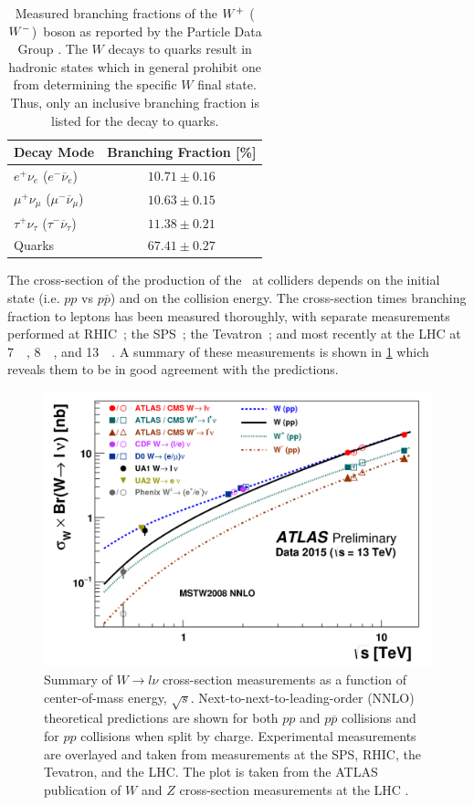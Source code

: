 \begin{table}[ht]
\centering
\begin{tabular}{l|c}
Decay Mode &  Branching Fraction [\%]\\
\hline
$e^+\nu_e$ ($e^-\overline{\nu}_e$) & $10.71 \pm 0.16$ \\
$\mu^+\nu_{\mu}$ ($\mu^-\overline{\nu}_{\mu}$) & $10.63 \pm 0.15$\\
$\tau^+\nu_{\tau}$ ($\tau^-\overline{\nu}_{\tau}$) & $11.38 \pm 0.21$\\
Quarks & $67.41 \pm 0.27$\\
\end{tabular}
\caption{Measured branching fractions of the $W^+$ ($W^-$)~boson 
as reported by the Particle Data Group \cite{PDG:2014}.  The $W$ decays
to quarks result in hadronic states which in general prohibit
one from determining the specific $W$ final state. Thus, only 
an inclusive branching fraction is listed for the decay to quarks.}
\label{tab:theory_wdecay}
\end{table}


The cross-section of the production of the \dubya~at colliders
depends on the initial state (i.e. $pp$ vs $p\overline{p}$) and on the
collision energy. 
The cross-section times branching fraction to leptons 
has been measured thoroughly, with separate measurements performed
at RHIC~\cite{PhysRevLett.106.062001};
the SPS~\cite{Albajar1987271,Alitti1992365};
the Tevatron~\cite{0954-3899-34-12-001,D0-4403-CONF};
and most recently at the LHC 
at 7~\TeV~\cite{PhysRevD.85.072004,Chatrchyan:1370079}, 
8~\TeV~\cite{PhysRevLett.112.191802}, 
and 13~\TeV~\cite{ATLAS-CONF-2015-039,CMS-PAS-SMP-15-004}. 
A summary of these measurements is shown in 
\fig\ref{fig:theory_wxsec} which reveals them to be in good agreement with 
the predictions.

\begin{figure}[ht]
\centering
\includegraphics[width=.8\textwidth]{figures/theory/wxsec.png}
\caption{Summary of $W\rightarrow l\nu$ cross-section measurements as 
a function of center-of-mass energy, $\sqrt{s}$. 
Next-to-next-to-leading-order (NNLO) theoretical
predictions are shown for both $pp$ and 
$p\overline{p}$ collisions and for $pp$ collisions when split by charge.
Experimental measurements are overlayed and taken from measurements
at the SPS, RHIC, the Tevatron, and the LHC.  The plot is taken
from the ATLAS publication of $W$ and $Z$ cross-section measurements
at the LHC \cite{ATLAS-CONF-2015-039}.  }
\label{fig:theory_wxsec}
\end{figure}

